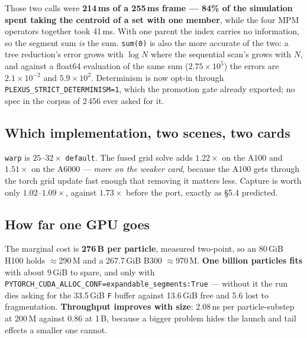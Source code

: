 \documentclass[11pt,a4paper]{article}
\newcommand{\code}[1]{\texttt{\small #1}}
\newcommand{\gd}[1]{\textcolor{good}{\textbf{#1}}}
\begin{document}
Those two calls were \textbf{214\,ms of a 255\,ms frame --- 84\% of the simulation spent taking the
centroid of a set with one member}, while the four MPM operators together took 41\,ms. With one
parent the index carries no information, so the segment sum \emph{is} the sum. \code{sum(0)} is also
the more accurate of the two: a tree reduction's error grows with $\log N$ where the sequential
scan's grows with $N$, and against a float64 evaluation of the same sum ($2.75\times10^{5}$) the
errors are $2.1\times10^{-2}$ and $5.9\times10^{2}$. Determinism is now opt-in through
\code{PLEXUS\_STRICT\_DETERMINISM=1}, which the promotion gate already exported; no spec in the
corpus of 2\,456 ever asked for it.

\subsection{Which implementation, two scenes, two cards}

\begin{center}\scriptsize\tblImplSweep\end{center}

\noindent
\code{warp} is $25$--$32\times$ \code{default}. The fused grid solve adds \gd{$1.22\times$} on the
A100 and \gd{$1.51\times$} on the A6000 --- \emph{more on the weaker card}, because the A100 gets
through the torch grid update fast enough that removing it matters less. Capture is worth only
$1.02$--$1.09\times$, against $1.73\times$ before the port, exactly as \S5.4 predicted.

\subsection{How far one GPU goes}

\begin{center}\footnotesize\tblScaling\end{center}

\noindent
The marginal cost is \textbf{276\,B per particle}, measured two-point, so an 80\,GiB H100 holds
$\approx$290\,M and a 267.7\,GiB B300 $\approx$970\,M. \textbf{One billion particles fits} with about
9\,GiB to spare, and only with \code{PYTORCH\_CUDA\_ALLOC\_CONF=expandable\_segments:True} --- without
it the run dies asking for the 33.5\,GiB \code{F} buffer against 13.6\,GiB free and 5.6 lost to
fragmentation. \textbf{Throughput improves with size}: 2.08\,ns per particle-substep at 200\,M
against 0.86 at 1\,B, because a bigger problem hides the launch and tail effects a smaller one
cannot.
\end{document}
